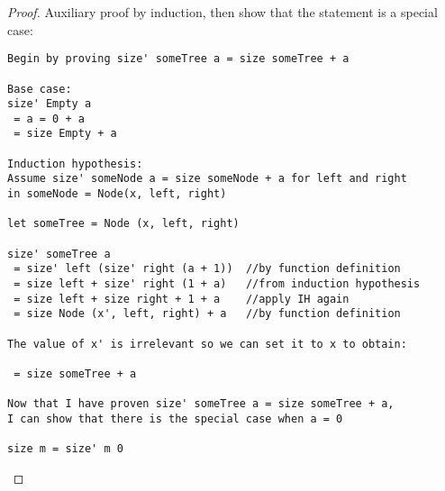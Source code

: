 \documentclass{article}
\theoremstyle{definition}
\begin{document}
\begin{proof}

Auxiliary proof by induction, then show that the statement is a special case: 

\begin{verbatim}
Begin by proving size' someTree a = size someTree + a

Base case: 
size' Empty a 
 = a = 0 + a
 = size Empty + a

Induction hypothesis:
Assume size' someNode a = size someNode + a for left and right
in someNode = Node(x, left, right)

let someTree = Node (x, left, right)

size' someTree a 
 = size' left (size' right (a + 1))  //by function definition
 = size left + size' right (1 + a)   //from induction hypothesis
 = size left + size right + 1 + a    //apply IH again
 = size Node (x', left, right) + a   //by function definition

The value of x' is irrelevant so we can set it to x to obtain:

 = size someTree + a

Now that I have proven size' someTree a = size someTree + a, 
I can show that there is the special case when a = 0

size m = size' m 0
\end{verbatim}

\end{proof}
\end{document}
